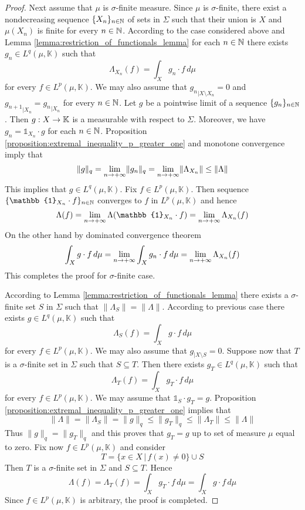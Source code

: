 \begin{proof}
  Next assume that $\mu$ is $\sigma$-finite measure. Since $\mu$ is $\sigma$-finite, there exist a nondecreasing sequence $\{X_n\}_{n\in {\mathbb N}}$ of sets in $\Sigma$ such that their union is $X$ and $\mu(X_n)$ is finite for every $n\in {\mathbb N}$. According to the case considered above and Lemma \ref{lemma:restriction_of_functionals_lemma} for each $n \in {\mathbb N}$ there exists $g_n\in L^q(\mu,\mathbb{K})$ such that
  $$\Lambda_{X_n}\left(f\right) = \int_Xg_n\cdot f\,d\mu$$
  for every $f \in L^p(\mu,\mathbb{K})$. We may also assume that ${g_n}_{\mid X\setminus X_n} = 0$ and ${g_{n+1}}_{\mid X_n} = {g_n}_{\mid X_n}$ for every $n \in {\mathbb N}$. Let $g$ be a pointwise limit of a sequence $\{g_n\}_{n\in {\mathbb N}}$. Then $g:X\rightarrow \mathbb{K}$ is a measurable with respect to $\Sigma$. Moreover, we have $g_n = \mathbb{1}_{X_n}\cdot g$ for each $n \in {\mathbb N}$. Proposition \ref{proposition:extremal_inequality_p_greater_one} and monotone convergence imply that
  $$\lVert g \rVert_q = \lim_{n\rightarrow +\infty}\lVert g_n\rVert_q = \lim_{n\rightarrow +\infty}\lVert \Lambda_{X_n} \rVert \leq \lVert \Lambda \rVert$$
  This implies that $g \in L^q(\mu,\mathbb{K})$. Fix $f \in L^p(\mu, \mathbb{K})$. Then sequence $\{\mathbb{1}_{X_n}\cdot f\}_{n \in \NN}$ converges to $f$ in $L^p(\mu,\mathbb{K})$ and hence
  $$\Lambda(f) = \lim_{n\ra +\infty}\Lambda(\mathbb{1}_{X_n}\cdot f) = \lim_{n\ra +\infty}\Lambda_{X_n}(f)$$
  On the other hand by dominated convergence theorem
  $$\int_Xg\cdot f\,d\mu = \lim_{n\rightarrow +\infty}\int_Xg_n\cdot f\,d\mu = \lim_{n\rightarrow +\infty}\Lambda_{X_n}(f)$$
  This completes the proof for $\sigma$-finite case.

  According to Lemma \ref{lemma:restriction_of_functionals_lemma} there exists a $\sigma$-finite set $S$ in $\Sigma$ such that $\lVert \Lambda_S \rVert = \lVert \Lambda \rVert$. According to previous case there exists $g \in L^q(\mu,\mathbb{K})$ such that
  $$\Lambda_S(f) = \int_Xg\cdot f\,d\mu$$
  for every $f \in L^p(\mu,\mathbb{K})$. We may also assume that $g_{\mid X\setminus S} = 0$. Suppose now that $T$ is a $\sigma$-finite set in $\Sigma$ such that $S\subseteq T$. Then there exists $g_T \in L^q(\mu,\mathbb{K})$ such that
  $$\Lambda_{T}(f) = \int_Xg_T\cdot f\,d\mu$$
  for every $f \in L^p(\mu,\mathbb{K})$. We may assume that $\mathbb{1}_S \cdot g_T = g$. Proposition \ref{proposition:extremal_inequality_p_greater_one} implies that
  $$\lVert \Lambda \rVert = \lVert \Lambda_S \rVert = \lVert g \rVert_q \leq \lVert g_T \rVert_q \leq \lVert \Lambda_{T}\rVert \leq \lVert \Lambda \rVert$$
  Thus $\lVert g \rVert_q = \lVert g_T \rVert_q$ and this proves that $g_T = g$ up to set of measure $\mu$ equal to zero. Fix now $f \in L^p(\mu,\mathbb{K})$ and consider
  $$T = \big\{x\in X\,\big|\,f(x) \neq 0\big\} \cup S$$
  Then $T$ is a $\sigma$-finite set in $\Sigma$ and $S\subseteq T$. Hence
  $$\Lambda(f) = \Lambda_T(f) = \int_Xg_T\cdot f\,d\mu = \int_Xg\cdot f\,d\mu$$
  Since $f \in L^p(\mu,\mathbb{K})$ is arbitrary, the proof is completed.
\end{proof}


